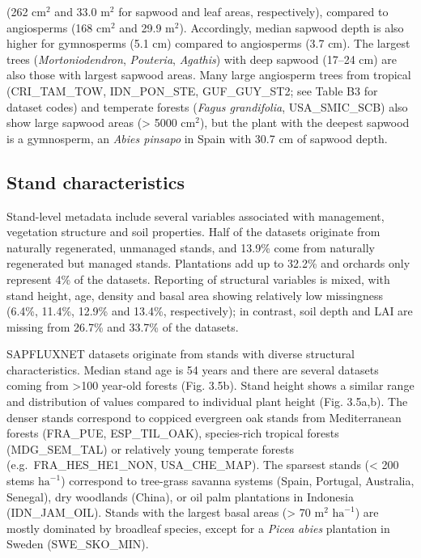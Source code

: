 \documentclass[11pt,twoside]{reedthesis}
\begin{document}
(262 \(\text{cm}^2\) and 33.0 \(\text{m}^2\) for sapwood and leaf areas,
respectively), compared to angiosperms (168 \(\text{cm}^2\) and 29.9
\(\text{m}^2\)). Accordingly, median sapwood depth is also higher for
gymnosperms (5.1 cm) compared to angiosperms (3.7 cm). The largest trees
(\emph{Mortoniodendron}, \emph{Pouteria}, \emph{Agathis}) with deep
sapwood (17--24 cm) are also those with largest sapwood areas. Many
large angiosperm trees from tropical (CRI\_TAM\_TOW, IDN\_PON\_STE,
GUF\_GUY\_ST2; see Table B3 for dataset codes) and temperate forests
(\emph{Fagus grandifolia}, USA\_SMIC\_SCB) also show large sapwood areas
(\textgreater{} 5000 \(\text{cm}^2\)), but the plant with the deepest
sapwood is a gymnosperm, an \emph{Abies pinsapo} in Spain with 30.7 cm
of sapwood depth.\par

\subsection{Stand characteristics}\label{stand-characteristics}

Stand-level metadata include several variables associated with
management, vegetation structure and soil properties. Half of the
datasets originate from naturally regenerated, unmanaged stands, and
13.9\% come from naturally regenerated but managed stands. Plantations
add up to 32.2\% and orchards only represent 4\% of the datasets.
Reporting of structural variables is mixed, with stand height, age,
density and basal area showing relatively low missingness (6.4\%,
11.4\%, 12.9\% and 13.4\%, respectively); in contrast, soil depth and
LAI are missing from 26.7\% and 33.7\% of the datasets.\par

SAPFLUXNET datasets originate from stands with diverse structural
characteristics. Median stand age is 54 years and there are several
datasets coming from \textgreater{}100 year-old forests (Fig. 3.5b).
Stand height shows a similar range and distribution of values compared
to individual plant height (Fig. 3.5a,b). The denser stands correspond
to coppiced evergreen oak stands from Mediterranean forests (FRA\_PUE,
ESP\_TIL\_OAK), species-rich tropical forests (MDG\_SEM\_TAL) or
relatively young temperate forests (e.g.~FRA\_HES\_HE1\_NON,
USA\_CHE\_MAP). The sparsest stands (\textless{} 200 stems
\(\text{ha}^{-1}\)) correspond to tree-grass savanna systems (Spain,
Portugal, Australia, Senegal), dry woodlands (China), or oil palm
plantations in Indonesia (IDN\_JAM\_OIL). Stands with the largest basal
areas (\textgreater{} 70 \(\text{m}^2\) \(\text{ha}^{-1}\)) are mostly
dominated by broadleaf species, except for a \emph{Picea abies}
plantation in Sweden (SWE\_SKO\_MIN).\par
\end{document}
